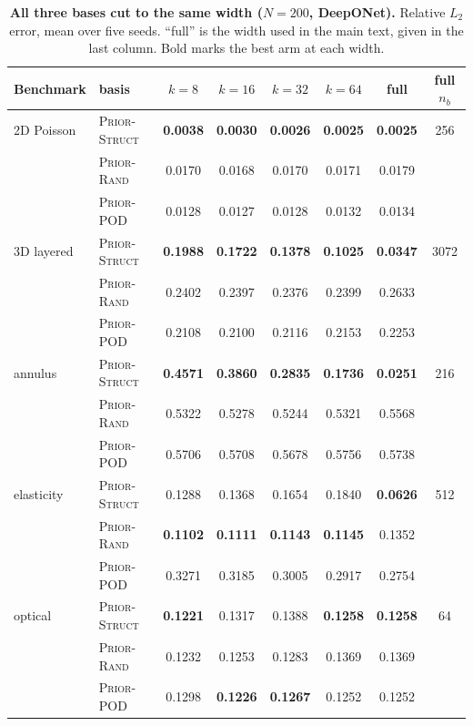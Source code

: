 \documentclass{article}
\newcommand{\armstruct}{\textsc{Prior-Struct}}
\newcommand{\armrand}{\textsc{Prior-Rand}}
\newcommand{\armpod}{\textsc{Prior-POD}}
\begin{document}
\begin{table}[H]
\centering
\caption{\textbf{All three bases cut to the same width ($N{=}200$, DeepONet).} Relative $L_2$
error, mean over five seeds. ``full'' is the width used in the main text, given in the last
column. Bold marks the best arm at each width.}
\label{tab:rank}
\footnotesize
\setlength{\tabcolsep}{6pt}
\renewcommand{\arraystretch}{0.8}
\vspace{1mm}
\begin{tabular}{@{}llccccc c@{}}
\toprule
Benchmark & basis & $k{=}8$ & $k{=}16$ & $k{=}32$ & $k{=}64$ & full & full $n_b$\\
\midrule
2D Poisson & \armstruct & \textbf{0.0038} & \textbf{0.0030} & \textbf{0.0026} & \textbf{0.0025} & \textbf{0.0025} & 256\\
           & \armrand   & 0.0170 & 0.0168 & 0.0170 & 0.0171 & 0.0179 & \\
           & \armpod    & 0.0128 & 0.0127 & 0.0128 & 0.0132 & 0.0134 & \\
3D layered & \armstruct & \textbf{0.1988} & \textbf{0.1722} & \textbf{0.1378} & \textbf{0.1025} & \textbf{0.0347} & 3072\\
           & \armrand   & 0.2402 & 0.2397 & 0.2376 & 0.2399 & 0.2633 & \\
           & \armpod    & 0.2108 & 0.2100 & 0.2116 & 0.2153 & 0.2253 & \\
annulus    & \armstruct & \textbf{0.4571} & \textbf{0.3860} & \textbf{0.2835} & \textbf{0.1736} & \textbf{0.0251} & 216\\
           & \armrand   & 0.5322 & 0.5278 & 0.5244 & 0.5321 & 0.5568 & \\
           & \armpod    & 0.5706 & 0.5708 & 0.5678 & 0.5756 & 0.5738 & \\
elasticity & \armstruct & 0.1288 & 0.1368 & 0.1654 & 0.1840 & \textbf{0.0626} & 512\\
           & \armrand   & \textbf{0.1102} & \textbf{0.1111} & \textbf{0.1143} & \textbf{0.1145} & 0.1352 & \\
           & \armpod    & 0.3271 & 0.3185 & 0.3005 & 0.2917 & 0.2754 & \\
optical    & \armstruct & \textbf{0.1221} & 0.1317 & 0.1388 & \textbf{0.1258} & \textbf{0.1258} & 64\\
           & \armrand   & 0.1232 & 0.1253 & 0.1283 & 0.1369 & 0.1369 & \\
           & \armpod    & 0.1298 & \textbf{0.1226} & \textbf{0.1267} & 0.1252 & 0.1252 & \\
\bottomrule
\end{tabular}
\vspace{-3mm}
\end{table}
\end{document}
